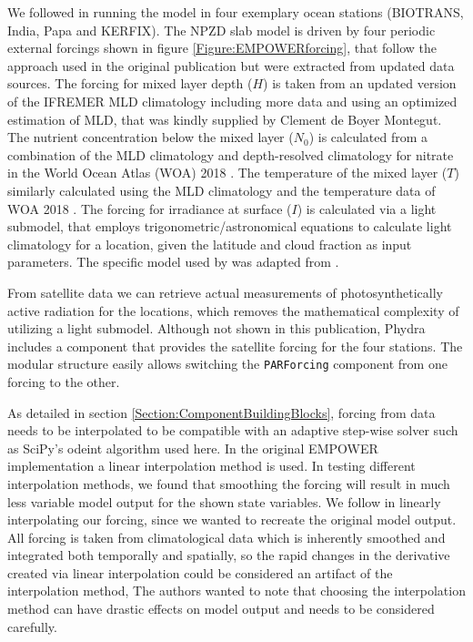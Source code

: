 \documentclass[journal abbreviation, manuscript]{copernicus}
\begin{document}
We followed \citet{Anderson2015c} in running the model in four exemplary ocean stations (BIOTRANS, India, Papa and KERFIX). The NPZD slab model is driven by four periodic external forcings shown in figure \ref{Figure:EMPOWERforcing}, that follow the approach used in the original publication but were extracted from updated data sources. 
The forcing for mixed layer depth ($H$) is taken from an updated version of the IFREMER MLD climatology  \citep{DeBoyerMontegut2004} including more data and using an optimized estimation of MLD, that was kindly supplied by Clement de Boyer Montegut.
The nutrient concentration below the mixed layer ($N_0$) is calculated from a combination of the MLD climatology and depth-resolved climatology for nitrate in the World Ocean Atlas (WOA) 2018 \citep{Garcia2019WORLDSilicate}. The temperature of the mixed layer ($T$) similarly calculated using the MLD climatology and the temperature data of WOA 2018 \citep{Locarnini2019WorldTemperature}.
The forcing for irradiance at surface ($I$) is calculated via a light submodel, that employs trigonometric/astronomical equations to calculate light climatology for a location, given the latitude and cloud fraction as input parameters. The specific model used by \citet{Anderson2015c} was adapted from \citet{Shine1984ParametrizationAlbedo}.

From satellite data we can retrieve actual measurements of photosynthetically active radiation for the locations, which removes the mathematical complexity of utilizing a light submodel. 
Although not shown in this publication, Phydra includes a component that provides the satellite forcing for the four stations. The modular structure easily allows switching the \texttt{PARForcing} component from one forcing to the other.

As detailed in section \ref{Section:ComponentBuildingBlocks}, forcing from data needs to be interpolated to be compatible with an adaptive step-wise solver such as SciPy's odeint algorithm used here. In the original EMPOWER implementation a linear interpolation method is used. In testing different interpolation methods, we found that smoothing the forcing will result in much less variable model output for the shown state variables. We follow \citet{Anderson2015c} in linearly interpolating our forcing, since we wanted to recreate the original model output. All forcing is taken from climatological data which is inherently smoothed and integrated both temporally and spatially, so the rapid changes in the derivative created via linear interpolation could be considered an artifact of the interpolation method, The authors wanted to note that choosing the interpolation method can have drastic effects on model output and needs to be considered carefully.
\end{document}
